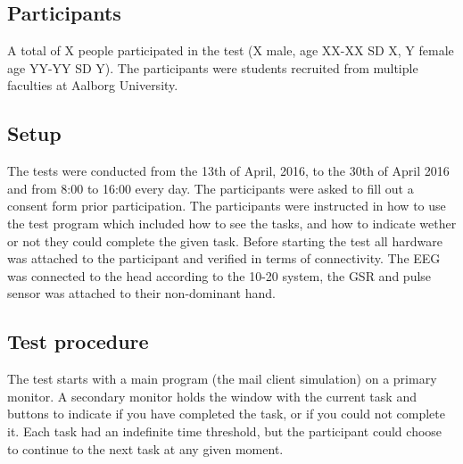 \subsection{Participants}
A total of X people participated in the test (X male, age XX-XX SD X, Y female age YY-YY SD Y).
The participants were students recruited from multiple faculties at Aalborg University.

\subsection{Setup}
The tests were conducted from the 13th of April, 2016, to the 30th of April 2016 and from 8:00 to 16:00 every day. 
The participants were asked to fill out a consent form prior participation. 
The participants were instructed in how to use the test program which included how to see the tasks, and how to indicate wether or not they could complete the given task. 
Before starting the test all hardware was attached to the participant and verified in terms of connectivity. 
The EEG was connected to the head according to the 10-20 system\cite{eeg_tech_10_20}, the GSR and pulse sensor was attached to their non-dominant hand. 

\subsection{Test procedure}
The test starts with a main program (the mail client simulation) on a primary monitor. 
A secondary monitor holds the window with the current task and buttons to indicate if you have completed the task, or if you could not complete it. 
Each task had an indefinite time threshold, but the participant could choose to continue to the next task at any given moment. 
